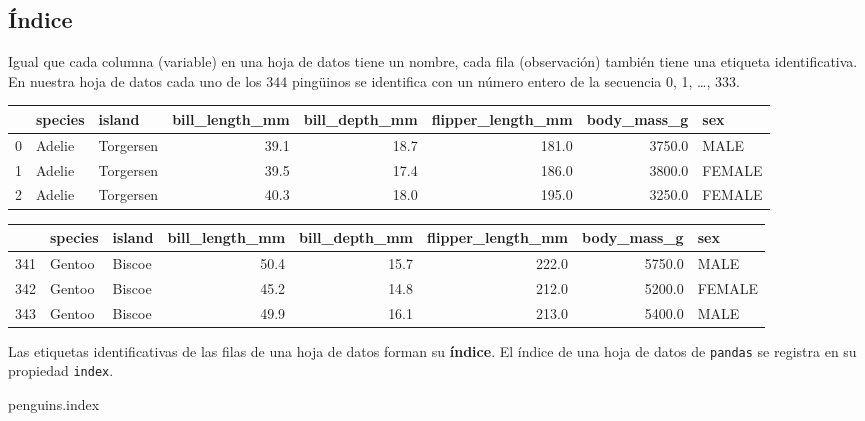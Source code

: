 \documentclass[
  a4paper,
  noprof,
  12pt,
  notoc,
  nosols,
  nobib]{mnye}
\newenvironment{Shaded}{\begin{snugshade}}{\end{snugshade}}
\newcommand{\NormalTok}[1]{\textcolor[rgb]{0.00,0.23,0.31}{#1}}
\theoremstyle{definition}
\theoremstyle{remark}
\begin{document}
\hypertarget{uxedndice}{%
\subsection{Índice}\label{uxedndice}}

Igual que cada columna (variable) en una hoja de datos tiene un nombre,
cada fila (observación) también tiene una etiqueta identificativa. En
nuestra hoja de datos cada uno de los \(344\) pingüinos se identifica
con un número entero de la secuencia 0, 1, \ldots, 333.

\begin{tabular}{lllrrrrl}
\toprule
{} & species &     island &  bill\_length\_mm &  bill\_depth\_mm &  flipper\_length\_mm &  body\_mass\_g &     sex \\
\midrule
0 &  Adelie &  Torgersen &            39.1 &           18.7 &              181.0 &       3750.0 &    MALE \\
1 &  Adelie &  Torgersen &            39.5 &           17.4 &              186.0 &       3800.0 &  FEMALE \\
2 &  Adelie &  Torgersen &            40.3 &           18.0 &              195.0 &       3250.0 &  FEMALE \\
\bottomrule
\end{tabular}

\begin{tabular}{lllrrrrl}
\toprule
{} & species &  island &  bill\_length\_mm &  bill\_depth\_mm &  flipper\_length\_mm &  body\_mass\_g &     sex \\
\midrule
341 &  Gentoo &  Biscoe &            50.4 &           15.7 &              222.0 &       5750.0 &    MALE \\
342 &  Gentoo &  Biscoe &            45.2 &           14.8 &              212.0 &       5200.0 &  FEMALE \\
343 &  Gentoo &  Biscoe &            49.9 &           16.1 &              213.0 &       5400.0 &    MALE \\
\bottomrule
\end{tabular}

Las etiquetas identificativas de las filas de una hoja de datos forman
su \textbf{índice}. El índice de una hoja de datos de \texttt{pandas} se
registra en su propiedad \texttt{index}.

\begin{Shaded}
\begin{Highlighting}[]
\NormalTok{penguins.index}
\end{Highlighting}
\end{Shaded}
\end{document}
